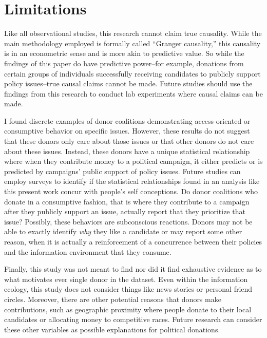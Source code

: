 \documentclass[12pt,]{article}
\begin{document}
\hypertarget{limitations}{%
\section{Limitations}\label{limitations}}

Like all observational studies, this research cannot claim true
causality. While the main methodology employed is formally called
``Granger causality,'' this causality is in an econometric sense and is
more akin to predictive value. So while the findings of this paper do
have predictive power--for example, donations from certain groups of
individuals successfully receiving candidates to publicly support policy
issues--true causal claims cannot be made. Future studies should use the
findings from this research to conduct lab experiments where causal
claims can be made.

I found discrete examples of donor coalitions demonstrating
access-oriented or consumptive behavior on specific issues. However,
these results do not suggest that these donors only care about those
issues or that other donors do not care about these issues. Instead,
these donors have a unique statistical relationship where when they
contribute money to a political campaign, it either predicts or is
predicted by campaigns' public support of policy issues. Future studies
can employ surveys to identify if the statistical relationships found in
an analysis like this present work concur with people's self
conceptions. Do donor coalitions who donate in a consumptive fashion,
that is where they contribute to a campaign after they publicly support
an issue, actually report that they prioritize that issue? Possibly,
these behaviors are subconscious reactions. Donors may not be able to
exactly identify \emph{why} they like a candidate or may report some
other reason, when it is actually a reinforcement of a concurrence
between their policies and the information environment that they
consume.

Finally, this study was not meant to find nor did it find exhaustive
evidence as to what motivates ever single donor in the dataset. Even
within the information ecology, this study does not consider things like
news stories or personal friend circles. Moreover, there are other
potential reasons that donors make contributions, such as geographic
proximity where people donate to their local candidates or allocating
money to competitive races. Future research can consider these other
variables as possible explanations for political donations.
\end{document}
